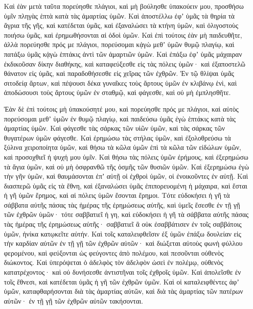 {\par }{\PP {}Καὶ ἐὰν μετὰ ταῦτα πορεύησθε πλάγιοι, καὶ μὴ βούλησθε ὑπακούειν μου, προσθήσω ὑμῖν πληγὰς ἑπτὰ κατὰ τὰς ἁμαρτίας ὑμῶν.
Καὶ ἀποστέλλω ἐφʼ ὑμᾶς τὰ θηρία τὰ ἄγρια τῆς γῆς, καὶ κατέδεται ὑμᾶς, καὶ ἐξαναλώσει τὰ κτήνη ὑμῶν, καὶ ὀλιγοστοὺς ποιήσω ὑμᾶς, καὶ ἐρημωθήσονται αἱ ὁδοὶ ὑμῶν.
Καὶ ἐπὶ τούτοις ἐὰν μὴ παιδευθῆτε, ἀλλὰ πορεύησθε πρός με πλάγιοι,
πορεύσομαι κᾀγὼ μεθʼ ὑμῶν θυμῷ πλαγίῳ, καὶ πατάξω ὑμᾶς κᾀγὼ ἑπτάκις ἀντὶ τῶν ἁμαρτιῶν ὑμῶν.
Καὶ ἐπάξω ἐφʼ ὑμᾶς μάχαιραν ἐκδικοῦσαν δίκην διαθήκης, καὶ καταφεύξεσθε εἰς τὰς πόλεις ὑμῶν· καὶ ἐξαποστελῶ θάνατον εἰς ὑμᾶς, καὶ παραδοθήσεσθε εἰς χεῖρας τῶν ἐχθρῶν.
Ἐν τῷ θλίψαι ὑμᾶς σιτοδείᾳ ἄρτων, καὶ πέψουσι δέκα γυναῖκες τοὺς ἄρτους ὑμῶν ἐν κλιβάνῳ ἑνὶ, καὶ ἀποδώσουσι τοὺς ἄρτους ὑμῶν ἐν σταθμῷ, καὶ φάγεσθε, καὶ οὐ μὴ ἐμπλησθῆτε.
\par }{\PP {}Ἐὰν δὲ ἐπὶ τούτοις μὴ ὑπακούσητέ μου, καὶ πορεύησθε πρός με πλάγιοι,
καὶ αὐτὸς πορεύσομαι μεθʼ ὑμῶν ἐν θυμῷ πλαγίῳ, καὶ παιδεύσω ὑμᾶς ἐγὼ ἑπτάκις κατὰ τὰς ἁμαρτίας ὑμῶν.
Καὶ φάγεσθε τὰς σάρκας τῶν υἱῶν ὑμῶν, καὶ τὰς σάρκας τῶν θυγατέρων ὑμῶν φάγεσθε.
Καὶ ἐρημώσω τὰς στήλας ὑμῶν, καὶ ἐξολοθρεύσω τὰ ξύλινα χειροποίητα ὑμῶν, καὶ θήσω τὰ κῶλα ὑμῶν ἐπὶ τὰ κῶλα τῶν εἰδώλων ὑμῶν, καὶ προσοχθιεῖ ἡ ψυχή μου ὑμῖν.
Καὶ θήσω τὰς πόλεις ὑμῶν ἐρήμους, καὶ ἐξερημώσω τὰ ἅγια ὑμῶν, καὶ οὐ μὴ ὀσφρανθῶ τῆς ὀσμῆς τῶν θυσιῶν ὑμῶν.
Καὶ ἐξερημώσω ἐγὼ τὴν γῆν ὑμῶν, καὶ θαυμάσονται ἐπʼ αὐτῇ οἱ ἐχθροὶ ὑμῶν, οἱ ἐνοικοῦντες ἐν αὐτῇ.
Καὶ διασπερῶ ὑμᾶς εἰς τὰ ἔθνη, καὶ ἐξαναλώσει ὑμᾶς ἐπιπορευομένη ἡ μάχαιρα, καὶ ἔσται ἡ γῆ ὑμῶν ἔρημος, καὶ αἱ πόλεις ὑμῶν ἔσονται ἔρημοι.
Τότε εὐδοκήσει ἡ γῆ τὰ σάββατα αὐτῆς πάσας τὰς ἡμέρας τῆς ἐρημώσεως αὐτῆς,
καὶ ὑμεῖς ἔσεσθε ἐν τῇ γῇ τῶν ἐχθρῶν ὑμῶν· τότε σαββατιεῖ ἡ γη, καὶ εὐδοκήσει ἡ γῆ τὰ σάββατα αὐτῆς πάσας τὰς ἡμέρας τῆς ἐρημώσεως αὐτῆς· σαββατιεῖ ἃ οὐκ ἐσαββάτισεν ἐν τοῖς σαββάτοις ὑμῶν, ἡνίκα κατῳκεῖτε αὐτήν.
Καὶ τοῖς καταλειφθεῖσιν ἐξ ὑμῶν ἐπάξω δουλείαν εἰς τὴν καρδίαν αὐτῶν ἐν τῇ γῇ τῶν ἐχθρῶν αὐτῶν· καὶ διώξεται αὐτοὺς φωνὴ φύλλου φερομένου, καὶ φεύξονται ὡς φεύγοντες ἀπὸ πολέμου, καὶ πεσοῦνται οὐθενὸς διώκοντος.
Καὶ ὑπερόψεται ὁ ἀδελφὸς τὸν ἀδελφὸν ὡσεὶ ἐν πολέμῳ, οὐθενὸς κατατρέχοντος· καὶ οὐ δυνήσεσθε ἀντιστῆναι τοῖς ἐχθροῖς ὑμῶν.
Καὶ ἀπολεῖσθε ἐν τοῖς ἔθνεσι, καὶ κατέδεται ὑμᾶς ἡ γῆ τῶν ἐχθρῶν ὑμῶν.
Καὶ οἱ καταλειφθέντες ἀφʼ ὑμῶν, καταφθαρήσονται διὰ τὰς ἁμαρτίας αὐτῶν, καὶ διὰ τὰς ἁμαρτίας τῶν πατέρων αὐτῶν· ἐν τῇ γῇ τῶν ἐχθρῶν αὐτῶν τακήσονται.
}
